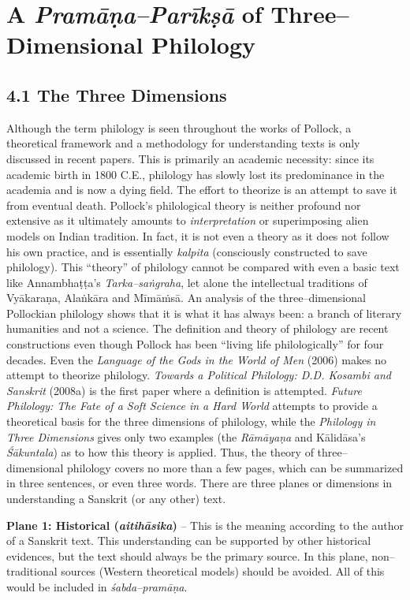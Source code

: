 
\chapter{A {\it {\bfseries Pramāṇa–Parīkṣā}} of Three–Dimensional Philology}\label{chapter4}

\section*{4.1 The Three Dimensions}

Although the term philology is seen throughout the works of Pollock, a theoretical framework and a methodology for understanding texts is only discussed in recent papers. This is primarily an academic necessity: since its academic birth in 1800 C.E., philology has slowly lost its predominance in the academia and is now a dying field. The effort to theorize is an attempt to save it from eventual death. Pollock’s philological theory is neither profound nor extensive as it ultimately amounts to \textit{interpretation} or superimposing alien models on Indian tradition. In fact, it is not even a theory as it does not follow his own practice, and is essentially \textit{kalpita} (consciously constructed to save philology). This “theory” of philology cannot be compared with even a basic text like Annambhaṭṭa’s \textit{Tarka–saṅgraha}, let alone the intellectual traditions of Vyākaraṇa, Alaṅkāra and Mīmāṁsā. An analysis of the three–dimensional Pollockian philology shows that it is what it has always been: a branch of literary humanities and not a science. The definition and theory of philology are recent constructions even though Pollock has been “living life philologically” for four decades. Even the \textit{Language of the Gods in the World of Men} (2006) makes no attempt to theorize philology. \textit{Towards a Political Philology: D.D. Kosambi and Sanskrit} (2008a) is the first paper where a definition is attempted. \textit{Future Philology: The Fate of a Soft Science in a Hard World} attempts to provide a theoretical basis for the three dimensions of philology, while the \textit{Philology in Three Dimensions} gives only two examples (the \textit{Rāmāyaṇa }and Kālidāsa’s \textit{Śākuntala}) as to how this theory is applied. Thus, the theory of three–dimensional philology covers no more than a few pages, which can be summarized in three sentences, or even three words. There are three planes or dimensions in understanding a Sanskrit (or any other) text.

\textbf{Plane 1: Historical (\textit{aitihāsika})} – This is the meaning according to the author of a Sanskrit text. This understanding can be supported by other historical evidences, but the text should always be the primary source. In this plane, non–traditional sources (Western theoretical models) should be avoided. All of this would be included in \textit{śabda–pramāṇa}.

